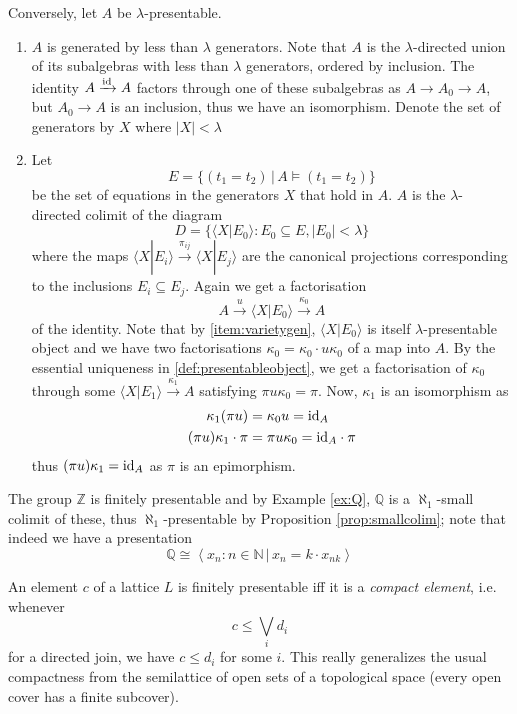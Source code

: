 Conversely, let $A$ be $\lambda$-presentable.
\begin{enumerate}
\item \label{item:varietygen} $A$ is generated by less than $\lambda$ generators. Note that $A$ is the $\lambda$-directed union of its subalgebras with less than $\lambda$ generators, ordered by inclusion. The identity $A \xrightarrow{\textrm{id}} A$ factors through one of these subalgebras as $A \to A_0 \to A$, but $A_0 \to A$ is an inclusion, thus we have an isomorphism. Denote the set of generators by $X$ where $|X| < \lambda$
\item Let \[ E = \{ (t_1 = t_2) \,|\, A \models (t_1 = t_2) \} \] be the set of equations in the generators $X$ that hold in $A$. $A$ is the $\lambda$-directed colimit of the diagram
\[ D = \{ \langle X|E_0\rangle : E_0 \subseteq E, |E_0| < \lambda \} \]
where the maps $\langle X|E_i\rangle \xrightarrow{\pi_{ij}} \langle X|E_j\rangle$ are the canonical projections corresponding to the inclusions $E_i \subseteq E_j$. Again we get a factorisation 
\[ A \xrightarrow{u} \langle X|E_0 \rangle \xrightarrow{\kappa_0} A \]
of the identity. Note that by \ref{item:varietygen}, $\langle X|E_0 \rangle$ is itself $\lambda$-presentable object and we have two factorisations $\kappa_0 = \kappa_0 \cdot u\kappa_0$ of a map into $A$. By the essential uniqueness in \ref{def:presentableobject}, we get a factorisation of $\kappa_0$ through some $\langle X|E_1 \rangle \xrightarrow{\kappa_1} A$ satisfying $\pi u \kappa_0 = \pi$. Now, $\kappa_1$ is an isomorphism as
\begin{align*}
\kappa_1 (\pi u) &= \kappa_0 u = \textrm{id}_A \\
(\pi u) \kappa_1 \cdot \pi &= \pi u \kappa_0 = \textrm{id}_A \cdot \pi
\end{align*}
thus $(\pi u) \kappa_1 = \textrm{id}_A$ as $\pi$ is an epimorphism.
\end{enumerate}

\begin{Example}
The group $\mathbb Z$ is finitely presentable and by Example \ref{ex:Q}, $\mathbb Q$ is a $\aleph_1$-small colimit of these, thus $\aleph_1$-presentable by Proposition \ref{prop:smallcolim}; note that indeed we have a presentation
\[ \mathbb Q \cong \left\langle x_n : n \in \mathbb N\,|\,x_n = k \cdot x_{nk} \right \rangle\]
\end{Example}

\begin{Example}
An element $c$ of a lattice $L$ is finitely presentable iff it is a \emph{compact element}, i.e. whenever
\[ c \leq \bigvee_i d_i \]
for a directed join, we have $c \leq d_i$ for some $i$. This really generalizes the usual compactness from the semilattice of open sets of a topological space (every open cover has a finite subcover).
\end{Example}


